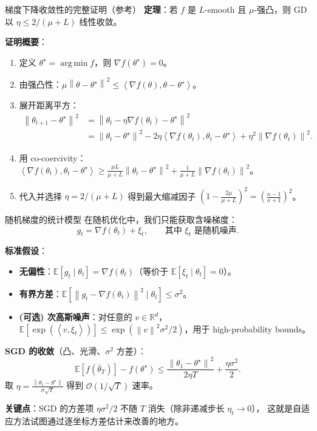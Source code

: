 \documentclass[aspectratio=169,10pt]{ctexbeamer}
\newcommand{\R}{\mathbb{R}}
\newcommand{\E}{\mathbb{E}}
\newcommand{\grad}{\nabla}
\newcommand{\norm}[1]{\left\lVert #1 \right\rVert}
\newcommand{\ip}[2]{\left\langle #1,#2 \right\rangle}
\DeclareMathOperator*{\argmin}{arg\,min}
\begin{document}
\begin{frame}{梯度下降收敛性的完整证明（参考）}
\textbf{定理}：若 $f$ 是 $L$-smooth 且 $\mu$-强凸，则 GD 以 $\eta\le2/(\mu+L)$ 线性收敛。

\vspace{.15cm}
\textbf{证明概要}：
\begin{enumerate}
  \item 定义 $\theta^\star=\argmin f$，则 $\grad f(\theta^\star)=0$。
  \item 由强凸性：$\mu\norm{\theta-\theta^\star}^2\le\ip{\grad f(\theta)}{\theta-\theta^\star}$。
  \item 展开距离平方：
  \[
    \begin{aligned}
    \norm{\theta_{t+1}-\theta^\star}^2
    &=\norm{\theta_t-\eta\grad f(\theta_t)-\theta^\star}^2\\
    &=\norm{\theta_t-\theta^\star}^2-2\eta\ip{\grad f(\theta_t)}{\theta_t-\theta^\star}
      +\eta^2\norm{\grad f(\theta_t)}^2.
    \end{aligned}
  \]
  \item 用 co-coercivity：$\ip{\grad f(\theta_t)}{\theta_t-\theta^\star}\ge
    \frac{\mu L}{\mu+L}\norm{\theta_t-\theta^\star}^2+\frac{1}{\mu+L}\norm{\grad f(\theta_t)}^2$。
  \item 代入并选择 $\eta=2/(\mu+L)$ 得到最大缩减因子 $(1-\frac{2\mu}{\mu+L})^2=(\frac{\kappa-1}{\kappa+1})^2$。
\end{enumerate}
\end{frame}

\begin{frame}{随机梯度的统计模型}
在随机优化中，我们只能获取含噪梯度：
\[
  g_t=\grad f(\theta_t)+\xi_t,\qquad\text{其中 }\xi_t\text{ 是随机噪声}.
\]

\vspace{.25cm}
\textbf{标准假设}：
\begin{itemize}
  \item \textbf{无偏性}：$\E[g_t\mid\theta_t]=\grad f(\theta_t)$（等价于 $\E[\xi_t\mid\theta_t]=0$）。
  \item \textbf{有界方差}：$\E[\norm{g_t-\grad f(\theta_t)}^2\mid\theta_t]\le\sigma^2$。
  \item \textbf{(可选) 次高斯噪声}：对任意的 $v\in\R^d$，$\E[\exp(\ip{v}{\xi_t})]\le\exp(\norm{v}^2\sigma^2/2)$，用于 high-probability bounds。
\end{itemize}

\vspace{.25cm}
\textbf{SGD 的收敛}（凸、光滑、$\sigma^2$ 方差）：
\[
  \E[f(\bar\theta_T)]-f(\theta^\star)\le
  \frac{\norm{\theta_1-\theta^\star}^2}{2\eta T}+\frac{\eta\sigma^2}{2}.
\]
取 $\eta=\frac{\norm{\theta_1-\theta^\star}}{\sigma\sqrt{T}}$ 得到 $\mathcal{O}(1/\sqrt{T})$ 速率。

\vspace{.25cm}
\textbf{关键点}：SGD 的方差项 $\eta\sigma^2/2$ 不随 $T$ 消失（除非递减步长 $\eta_t\to0$），
这就是自适应方法试图通过逐坐标方差估计来改善的地方。
\end{frame}
\end{document}
